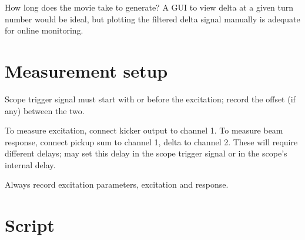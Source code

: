 \documentclass{article}
\begin{document}
How long does the movie take to generate? A GUI to view delta at a given turn number would be ideal, but plotting the filtered delta signal manually is adequate for online monitoring.

\section{Measurement setup}
Scope trigger signal must start with or before the excitation; record the offset (if any) between the two.

To measure excitation, connect kicker output to channel 1. To measure beam response, connect pickup sum to channel 1, delta to channel 2. These will require different delays; may set this delay in the scope trigger signal or in the scope's internal delay.

Always record excitation parameters, excitation and response.

\section{Script}
\end{document}
